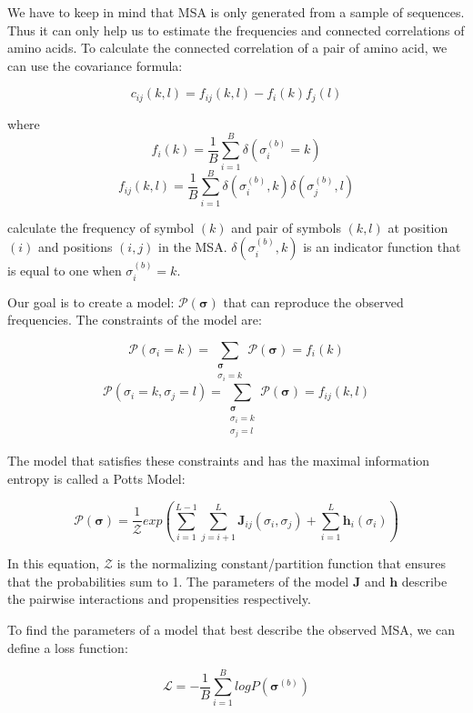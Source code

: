 We have to keep in mind that MSA is only generated from a sample of sequences. 
Thus it can only help us to estimate the frequencies and connected correlations of amino acids. 
To calculate the connected correlation of a pair of amino acid, we can use the covariance formula:
            
$$c_{ij}(k, l) = f_{ij}(k, l) - f_i(k) f_j(l)$$
        
where
$$f_i(k) = \frac{1}{B} \sum_{i = 1}^B \delta(\sigma_i^{(b)} = k)$$
$$f_{ij}(k, l) = \frac{1}{B} \sum_{i = 1}^B \delta(\sigma_i^{(b)}, k)\delta(\sigma_j^{(b)}, l)$$
        
calculate the frequency of symbol $(k)$ and pair of symbols $(k, l)$ at position $(i)$ and positions $(i, j)$ in the MSA. 
$\delta(\sigma_i^{(b)}, k)$ is an indicator function that is equal to one when $\sigma_i^{(b)} = k$.
        
        
Our goal is to create a model: $\mathcal{P(\bm{\sigma})}$ that can reproduce the observed frequencies. 
The constraints of the model are:
        
$$\mathcal{P}(\sigma_i = k) = \sum_{\substack{\bm{\sigma}\\ \sigma_i = k}} \mathcal{P}(\bm{\sigma}) = f_i(k)$$
$$\mathcal{P}(\sigma_i = k, \sigma_j = l) = \sum_{\substack{\bm{\sigma}\\ \sigma_i = k \\ \sigma_j = l}} \mathcal{P}(\bm{\sigma}) = f_{ij}(k, l)$$
        
The model that satisfies these constraints and has the maximal information entropy is called a Potts Model:
        
\begin{equation}
    \mathcal{P}(\bm{\sigma}) = \frac{1}{\mathcal{Z}} exp\left(\sum_{i = 1}^{L-1} \sum_{j=i+1}^L \bm{J}_{ij}(\sigma_i, \sigma_j) + \sum_{i=1}^L \bm{h}_i({\sigma_i})\right)
    \label{eq:Potts}
\end{equation}
    
In this equation, $\mathcal{Z}$ is the normalizing constant/partition function that ensures that the probabilities sum to 1. 
The parameters of the model $\bm{J}$ and $\bm{h}$ describe the pairwise interactions and propensities respectively.
        
To find the parameters of a model that best describe the observed MSA, we can define a loss function:
        
\begin{equation}
    \mathcal{L} = -\frac{1}{B} \sum_{i=1}^B logP(\bm{\sigma}^{(b)})
    \label{eq:potts_loss}
\end{equation}
        
